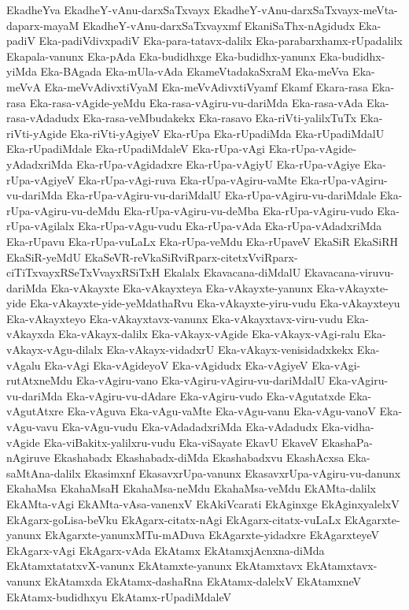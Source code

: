 {EkadheYva
EkadheY-vAnu-darxSaTxvayx
EkadheY-vAnu-darxSaTxvayx-meVta-daparx-mayaM
EkadheY-vAnu-darxSaTxvayxmf
EkaniSaThx-nAgidudx
Eka-padiV
Eka-padiVdivxpadiV
Eka-para-tatavx-dalilx
Eka-parabarxhamx-rUpadalilx
Ekapala-vanunx
Eka-pAda
Eka-budidhxge
Eka-budidhx-yanunx
Eka-budidhx-yiMda
Eka-BAgada
Eka-mUla-vAda
EkameVtadakaSxraM
Eka-meVva
Eka-meVvA
Eka-meVvAdivxtiVyaM
Eka-meVvAdivxtiVyamf
Ekamf
Ekara-rasa
Eka-rasa
Eka-rasa-vAgide-yeMdu
Eka-rasa-vAgiru-vu-dariMda
Eka-rasa-vAda
Eka-rasa-vAdadudx
Eka-rasa-veMbudakekx
Eka-rasavo
Eka-riVti-yalilxTuTx
Eka-riVti-yAgide
Eka-riVti-yAgiyeV
Eka-rUpa
Eka-rUpadiMda
Eka-rUpadiMdalU
Eka-rUpadiMdale
Eka-rUpadiMdaleV
Eka-rUpa-vAgi
Eka-rUpa-vAgide-yAdadxriMda
Eka-rUpa-vAgidadxre
Eka-rUpa-vAgiyU
Eka-rUpa-vAgiye
Eka-rUpa-vAgiyeV
Eka-rUpa-vAgi-ruva
Eka-rUpa-vAgiru-vaMte
Eka-rUpa-vAgiru-vu-dariMda
Eka-rUpa-vAgiru-vu-dariMdalU
Eka-rUpa-vAgiru-vu-dariMdale
Eka-rUpa-vAgiru-vu-deMdu
Eka-rUpa-vAgiru-vu-deMba
Eka-rUpa-vAgiru-vudo
Eka-rUpa-vAgilalx
Eka-rUpa-vAgu-vudu
Eka-rUpa-vAda
Eka-rUpa-vAdadxriMda
Eka-rUpavu
Eka-rUpa-vuLaLx
Eka-rUpa-veMdu
Eka-rUpaveV
EkaSiR
EkaSiRH
EkaSiR-yeMdU
EkaSeVR-reVkaSiRviRparx-citetxVviRparx-ciTiTxvayxRSeTxVvayxRSiTxH
Ekalalx
Ekavacana-diMdalU
Ekavacana-viruvu-dariMda
Eka-vAkayxte
Eka-vAkayxteya
Eka-vAkayxte-yanunx
Eka-vAkayxte-yide
Eka-vAkayxte-yide-yeMdathaRvu
Eka-vAkayxte-yiru-vudu
Eka-vAkayxteyu
Eka-vAkayxteyo
Eka-vAkayxtavx-vanunx
Eka-vAkayxtavx-viru-vudu
Eka-vAkayxda
Eka-vAkayx-dalilx
Eka-vAkayx-vAgide
Eka-vAkayx-vAgi-ralu
Eka-vAkayx-vAgu-dilalx
Eka-vAkayx-vidadxrU
Eka-vAkayx-venisidadxkekx
Eka-vAgalu
Eka-vAgi
Eka-vAgideyoV
Eka-vAgidudx
Eka-vAgiyeV
Eka-vAgi-rutAtxneMdu
Eka-vAgiru-vano
Eka-vAgiru-vAgiru-vu-dariMdalU
Eka-vAgiru-vu-dariMda
Eka-vAgiru-vu-dAdare
Eka-vAgiru-vudo
Eka-vAgutatxde
Eka-vAgutAtxre
Eka-vAguva
Eka-vAgu-vaMte
Eka-vAgu-vanu
Eka-vAgu-vanoV
Eka-vAgu-vavu
Eka-vAgu-vudu
Eka-vAdadadxriMda
Eka-vAdadudx
Eka-vidha-vAgide
Eka-viBakitx-yalilxru-vudu
Eka-viSayate
EkavU
EkaveV
EkashaPa-nAgiruve
Ekashabadx
Ekashabadx-diMda
Ekashabadxvu
EkashAcxsa
Eka-saMtAna-dalilx
Ekasimxnf
EkasavxrUpa-vanunx
EkasavxrUpa-vAgiru-vu-danunx
EkahaMsa
EkahaMsaH
EkahaMsa-neMdu
EkahaMsa-veMdu
EkAMta-dalilx
EkAMta-vAgi
EkAMta-vAsa-vanenxV
EkAkiVcarati
EkAginxge
EkAginxyalelxV
EkAgarx-goLisa-beVku
EkAgarx-citatx-nAgi
EkAgarx-citatx-vuLaLx
EkAgarxte-yanunx
EkAgarxte-yanunxMTu-mADuva
EkAgarxte-yidadxre
EkAgarxteyeV
EkAgarx-vAgi
EkAgarx-vAda
EkAtamx
EkAtamxjAcnxna-diMda
EkAtamxtatatxvX-vanunx
EkAtamxte-yanunx
EkAtamxtavx
EkAtamxtavx-vanunx
EkAtamxda
EkAtamx-dashaRna
EkAtamx-dalelxV
EkAtamxneV
EkAtamx-budidhxyu
EkAtamx-rUpadiMdaleV
}
